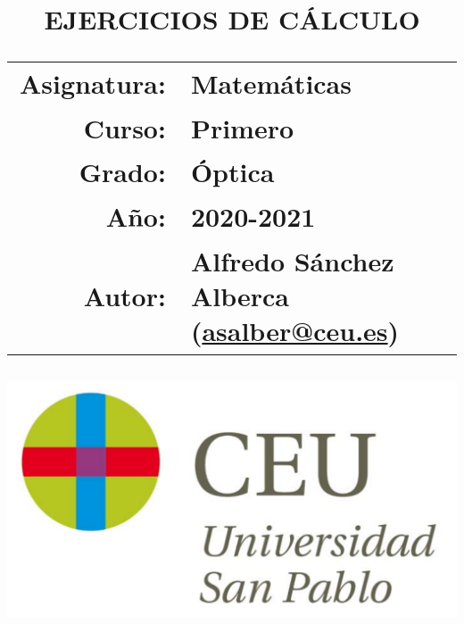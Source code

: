 \documentclass[a4paper,titlepage]{article}
\begin{document}
\sloppy

\title{\vskip 2cm
\Huge \textbf{\textsf{\quad \textcolor{blueceu}{EJERCICIOS DE CÁLCULO}\quad}}\\
   \vskip 1cm
\Large \sffamily
\begin{tabular}{rl}
\textcolor{blueceu}{Asignatura:} & Matemáticas\\
\textcolor{blueceu}{Curso:} & Primero\\
\textcolor{blueceu}{Grado:} &  Óptica\\
\textcolor{blueceu}{Año:} & 2020-2021\\
\textcolor{blueceu}{Autor:} & Alfredo S\'anchez Alberca (\url{asalber@ceu.es})
\end{tabular}
}

\author{}
\date{\includegraphics[scale=0.3]{img/logo_uspceu_01}}

\maketitle
\newpage
\tableofcontents
\newpage













%
%
%

 


%
\end{document}
